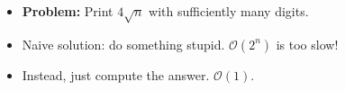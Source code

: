     \begin{frame}
    \frametitle{\problemtitle}
    \begin{itemize}
        \item<+-> \textbf{Problem:} Print $4\sqrt n$ with sufficiently many digits.
        \item<+-> Naive solution: do something stupid. $\mathcal O(2^n)$ is too slow!
        \item<+-> Instead, just compute the answer. $\mathcal O(1)$.
    \end{itemize}
\end{frame}
